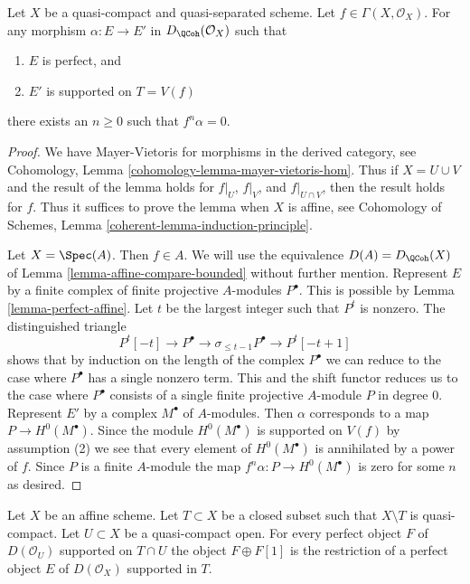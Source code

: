 \begin{lemma}
\label{lemma-perfect-into-support-on-T}
Let $X$ be a quasi-compact and quasi-separated scheme.
Let $f \in \Gamma(X, \mathcal{O}_X)$.
For any morphism $\alpha : E \to E'$ in
$D_\QCoh(\mathcal{O}_X)$ such that
\begin{enumerate}
\item $E$ is perfect, and
\item $E'$ is supported on $T = V(f)$
\end{enumerate}
there exists an $n \geq 0$ such that $f^n \alpha  = 0$.
\end{lemma}

\begin{proof}
We have Mayer-Vietoris for morphisms in the derived category, see
Cohomology, Lemma \ref{cohomology-lemma-mayer-vietoris-hom}.
Thus if $X = U \cup V$ and the result of the lemma holds
for $f|_U$, $f|_V$, and $f|_{U \cap V}$, then the result holds for $f$.
Thus it suffices to prove the lemma when $X$ is affine, see
Cohomology of Schemes, Lemma \ref{coherent-lemma-induction-principle}.

\medskip\noindent
Let $X = \Spec(A)$. Then $f \in A$. We will
use the equivalence $D(A) = D_\QCoh(X)$ of
Lemma \ref{lemma-affine-compare-bounded}
without further mention.
Represent $E$ by a finite complex of finite projective $A$-modules
$P^\bullet$. This is possible by Lemma \ref{lemma-perfect-affine}.
Let $t$ be the largest integer such that $P^t$ is nonzero.
The distinguished triangle
$$
P^t[-t] \to P^\bullet \to \sigma_{\leq t - 1}P^\bullet \to P^t[-t + 1]
$$
shows that by induction on the length of the complex $P^\bullet$
we can reduce to the case where $P^\bullet$ has a single nonzero term.
This and the shift functor reduces us to the case where $P^\bullet$
consists of a single finite projective $A$-module $P$ in degree $0$.
Represent $E'$ by a complex $M^\bullet$ of $A$-modules.
Then $\alpha$ corresponds to a map $P \to H^0(M^\bullet)$.
Since the module $H^0(M^\bullet)$ is supported on $V(f)$ by assumption (2)
we see that every element of $H^0(M^\bullet)$ is annihilated by a power
of $f$. Since $P$ is a finite $A$-module the map
$f^n\alpha : P \to H^0(M^\bullet)$ is zero for some $n$ as desired.
\end{proof}

\begin{lemma}
\label{lemma-lift-perfect-complex-plus-shift-support}
Let $X$ be an affine scheme. Let $T \subset X$ be a closed subset
such that $X \setminus T$ is quasi-compact. Let $U \subset X$ be a
quasi-compact open. For every perfect object $F$ of $D(\mathcal{O}_U)$
supported on $T \cap U$ the object $F \oplus F[1]$ is the restriction of
a perfect object $E$ of $D(\mathcal{O}_X)$ supported in $T$.
\end{lemma}

